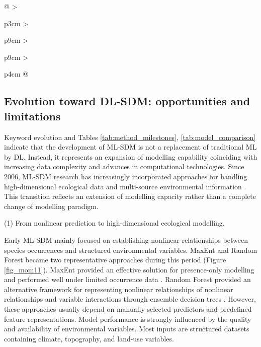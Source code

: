 \documentclass[authoryear,preprint,review,12pt]{elsarticle}
\begin{document}
\begin{landscape}
\begin{xltabular}{\linewidth}{
@{}
>{\raggedright\arraybackslash}p{3cm}
>{\raggedright\arraybackslash}p{9cm}
>{\raggedright\arraybackslash}p{9cm}
>{\raggedright\arraybackslash}p{4cm}
@{}
}
\addlinespace
\midrule
\end{xltabular}
\endgroup

\end{landscape}



\subsection{Evolution toward DL-SDM: opportunities and limitations}

Keyword evolution and Tables \ref{tab:method_milestones}, \ref{tab:model_comparison} indicate that the development of ML-SDM is not a replacement of traditional ML by DL. Instead, it represents an expansion of modelling capability coinciding with increasing data complexity and advances in computational technologies. Since 2006, ML-SDM research has increasingly incorporated approaches for handling high-dimensional ecological data and multi-source environmental information \citep{pichler2023machine}. This transition reflects an extension of modelling capacity rather than a complete change of modelling paradigm.

(1) From nonlinear prediction to high-dimensional ecological modelling.

Early ML-SDM mainly focused on establishing nonlinear relationships between species occurrences and structured environmental variables. MaxEnt and Random Forest became two representative approaches during this period (Figure \ref{fig_mom11}). MaxEnt provided an effective solution for presence-only modelling and performed well under limited occurrence data \citep{phillips2006maximum}. Random Forest provided an alternative framework for representing nonlinear relationships of nonlinear relationships and variable interactions through ensemble decision trees \citep{mi2017choose}. However, these approaches usually depend on manually selected predictors and predefined feature representations. Model performance is strongly influenced by the quality and availability of environmental variables. Most inputs are structured datasets containing climate, topography, and land-use variables.
\end{document}
